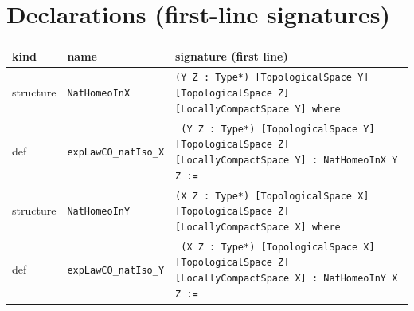 \documentclass[12pt]{article}
\begin{document}
\section*{Declarations (first-line signatures)} 
\begin{center}
\begin{tabular}{lll}
\textbf{kind} & \textbf{name} & \textbf{signature (first line)} \\ \hline
structure & \texttt{NatHomeoInX} & \texttt{(Y Z : Type*) [TopologicalSpace Y] [TopologicalSpace Z] [LocallyCompactSpace Y] where} \\
def & \texttt{expLawCO\_natIso\_X} & \texttt{ (Y Z : Type*) [TopologicalSpace Y] [TopologicalSpace Z] [LocallyCompactSpace Y] : NatHomeoInX Y Z :=} \\
structure & \texttt{NatHomeoInY} & \texttt{(X Z : Type*) [TopologicalSpace X] [TopologicalSpace Z] [LocallyCompactSpace X] where} \\
def & \texttt{expLawCO\_natIso\_Y} & \texttt{ (X Z : Type*) [TopologicalSpace X] [TopologicalSpace Z] [LocallyCompactSpace X] : NatHomeoInY X Z :=} \\
\end{tabular}
\end{center}
\end{document}
